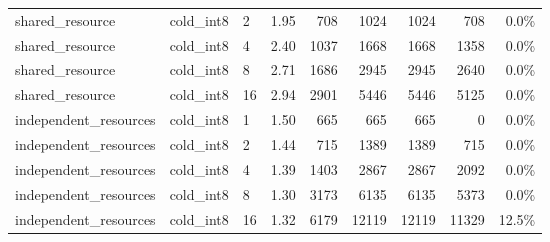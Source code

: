 \begin{tabular}{lllrrrrrr}
shared\_resource & cold\_int8 & 2 & 1.95 & 708 & 1024 & 1024 & 708 & 0.0\% \\
shared\_resource & cold\_int8 & 4 & 2.40 & 1037 & 1668 & 1668 & 1358 & 0.0\% \\
shared\_resource & cold\_int8 & 8 & 2.71 & 1686 & 2945 & 2945 & 2640 & 0.0\% \\
shared\_resource & cold\_int8 & 16 & 2.94 & 2901 & 5446 & 5446 & 5125 & 0.0\% \\
independent\_resources & cold\_int8 & 1 & 1.50 & 665 & 665 & 665 & 0 & 0.0\% \\
independent\_resources & cold\_int8 & 2 & 1.44 & 715 & 1389 & 1389 & 715 & 0.0\% \\
independent\_resources & cold\_int8 & 4 & 1.39 & 1403 & 2867 & 2867 & 2092 & 0.0\% \\
independent\_resources & cold\_int8 & 8 & 1.30 & 3173 & 6135 & 6135 & 5373 & 0.0\% \\
independent\_resources & cold\_int8 & 16 & 1.32 & 6179 & 12119 & 12119 & 11329 & 12.5\% \\
\bottomrule
\end{tabular}
